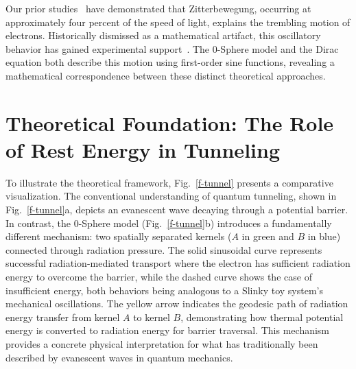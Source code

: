 \documentclass[%
 reprint,
 amsmath,amssymb,
 aps,
]{revtex4-1}
\numberwithin{equation}{section}%
\begin{document}
Our prior studies~\cite{hanamura2023} have demonstrated that Zitterbewegung, occurring at approximately four percent of the speed of light, explains the trembling motion of electrons. Historically dismissed as a mathematical artifact, this oscillatory behavior has gained experimental support~\cite{gerritsma2010, zawadzki2011}. The 0-Sphere model and the Dirac equation both describe this motion using first-order sine functions, revealing a mathematical correspondence between these distinct theoretical approaches.



\section{Theoretical Foundation: The Role of Rest Energy in Tunneling}
\label{sec:Theoretical Foundation}


To illustrate the theoretical framework, Fig.~\ref{f-tunnel} presents a comparative visualization. The conventional understanding of quantum tunneling, shown in Fig.~\ref{f-tunnel}a, depicts an evanescent wave decaying through a potential barrier. In contrast, the 0-Sphere model (Fig.~\ref{f-tunnel}b) introduces a fundamentally different mechanism: two spatially separated kernels ($A$ in green and $B$ in blue) connected through radiation pressure. The solid sinusoidal curve represents successful radiation-mediated transport where the electron has sufficient radiation energy to overcome the barrier, while the dashed curve shows the case of insufficient energy, both behaviors being analogous to a Slinky toy system's mechanical oscillations. The yellow arrow indicates the geodesic path of radiation energy transfer from kernel $A$ to kernel $B$, demonstrating how thermal potential energy is converted to radiation energy for barrier traversal. This mechanism provides a concrete physical interpretation for what has traditionally been described by evanescent waves in quantum mechanics.
\end{document}
